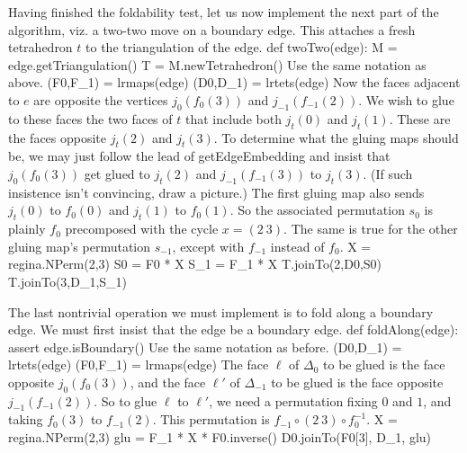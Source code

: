 \documentclass[10pt,twocolumn]{article}%
\theoremstyle{definition}
\begin{document}
\nwendcode{}\nwdocspar
Having finished the foldability test,
let us now implement the next part of the
algorithm, viz. a two-two move on a boundary edge.
This attaches a fresh tetrahedron $t$ to the
triangulation of the edge.
\nwenddocs{}\endmoddef\nwstartdeflinemarkup\nwenddeflinemarkup
def twoTwo(edge):
  M = edge.getTriangulation()
  T = M.newTetrahedron()
\nwendcode{}\nwdocspar
Use the same notation as above.
\nwenddocs{}\plusendmoddef\nwstartdeflinemarkup\nwenddeflinemarkup
  (F0,F_1) = lrmaps(edge)
  (D0,D_1) = lrtets(edge)
\nwendcode{}\nwdocspar
Now the faces adjacent to $e$ are
opposite the vertices $j_0(f_0(3))$
and $j_{-1}(f_{-1}(2))$. We wish
to glue to these faces the two faces of $t$ 
that include both $j_t(0)$ and $j_t(1)$. These
are the faces opposite $j_t(2)$ and $j_t(3)$.
\nwenddocs{}\nwdocspar
To determine what the gluing maps should be, 
we may just follow the lead of {\Tt{}getEdgeEmbedding\nwendquote} 
and insist that $j_0(f_0(3))$ get glued to $j_t(2)$
and $j_{-1}(f_{-1}(3))$ to $j_t(3)$. (If such insistence
isn't convincing, draw a picture.)
\nwenddocs{}\nwdocspar
The first gluing map also sends $j_t(0)$ to $f_0(0)$
and $j_t(1)$ to $f_0(1)$. So the associated permutation $s_0$
is plainly $f_0$ precomposed with the cycle $x = (2~3)$.
The same is true for the other gluing map's permutation $s_{-1}$, 
except with $f_{-1}$ instead of $f_0$.
\nwenddocs{}\plusendmoddef\nwstartdeflinemarkup\nwenddeflinemarkup
  X = regina.NPerm(2,3)
  S0 = F0 * X
  S_1 = F_1 * X
  T.joinTo(2,D0,S0)
  T.joinTo(3,D_1,S_1)

\nwendcode{}\nwdocspar
The last nontrivial operation we must implement
is to fold along a boundary edge. We must first
insist that the edge be a boundary edge.
\nwenddocs{}\endmoddef\nwstartdeflinemarkup\nwenddeflinemarkup
def foldAlong(edge):
  assert edge.isBoundary()
\nwendcode{}\nwdocspar
Use the same notation as before.
\nwenddocs{}\plusendmoddef\nwstartdeflinemarkup\nwenddeflinemarkup
  (D0,D_1) = lrtets(edge)
  (F0,F_1) = lrmaps(edge)
\nwendcode{}\nwdocspar
The face $\ell$ of $\Delta_0$ to be glued is
the face opposite $j_0(f_0(3))$, and the
face $\ell'$ of $\Delta_{-1}$ to be glued is
the face opposite $j_{-1}(f_{-1}(2))$.
So to glue $\ell$ to $\ell'$, we need
a permutation fixing $0$ and $1$, and
taking $f_0(3)$ to $f_{-1}(2)$. This
permutation is $f_{-1} \circ (2~3) \circ f_{0}^{-1}$.
\nwenddocs{}\plusendmoddef\nwstartdeflinemarkup\nwenddeflinemarkup
  X = regina.NPerm(2,3)
  glu = F_1 * X * F0.inverse()
  D0.joinTo(F0[3], D_1, glu)
\end{document}

